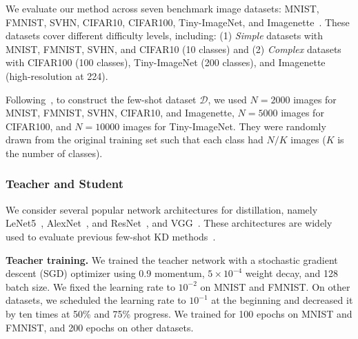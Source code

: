 \documentclass[12pt, a4paper, twoside]{book}
\numberwithin{equation}{chapter}
\theoremstyle{plain}
\theoremstyle{definition}
\theoremstyle{remark}
\newenvironment{foldable}{}{}
\begin{document}
\begin{foldable}
  We evaluate our method across seven benchmark image datasets: MNIST, FMNIST, SVHN, CIFAR10, CIFAR100, Tiny-ImageNet, and Imagenette~\cite{lecun1998gradient,xiao2017fashion,netzer2011reading,le2015tiny,krizhevsky2009learning,howard2020imagenette}.
  These datasets cover different difficulty levels, including: (1) \textit{Simple} datasets with MNIST, FMNIST, SVHN, and CIFAR10 (10 classes) and (2) \textit{Complex} datasets with CIFAR100 (100 classes), Tiny-ImageNet (200 classes), and Imagenette (high-resolution at 224).
\end{foldable}

\begin{foldable}
  Following~\cite{wang2020neural,nguyen2022black}, to construct the few-shot dataset $\mathcal{D}$, we used $N = 2000$ images for MNIST, FMNIST, SVHN, CIFAR10, and Imagenette, $N=5000$ images for CIFAR100, and $N=10000$ images for Tiny-ImageNet.
  They were randomly drawn from the original training set such that each class had $N/K$ images ($K$ is the number of classes).
\end{foldable}

\subsubsection{Teacher and Student}
\begin{foldable}
  We consider several popular network architectures for distillation, namely LeNet5~\cite{lecun1998gradient}, AlexNet~\cite{krizhevsky2012imagenet}, and ResNet~\cite{he2016deep}, and VGG~\cite{simonyan2014very}.
  These architectures are widely used to evaluate previous few-shot \ac{KD} methods~\cite{kimura2018few,wang2020neural,nguyen2022black}.
\end{foldable}

\begin{foldable}
  \textbf{Teacher training.} We trained the teacher network with a stochastic gradient descent (SGD) optimizer using 0.9 momentum, $5\times10^{-4}$ weight decay, and 128 batch size.
  We fixed the learning rate to $10^{-2}$ on MNIST and FMNIST.
  On other datasets, we scheduled the learning rate to $10^{-1}$ at the beginning and decreased it by ten times at 50\% and 75\% progress.
  We trained for 100 epochs on MNIST and FMNIST, and 200 epochs on other datasets.
\end{foldable}
\end{document}
